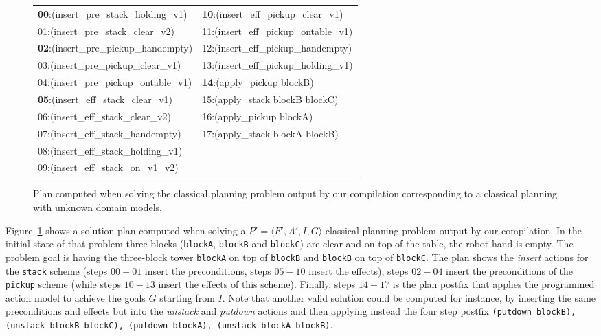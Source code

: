 \documentclass{article}
\newcommand{\tup}[1]{{\langle #1 \rangle}}
\begin{document}
\begin{figure}[hbt!]
	{\tiny\tt

\begin{tabular}{ll}
		{\bf 00}:(insert\_pre\_stack\_holding\_v1) & {\bf 10}:(insert\_eff\_pickup\_clear\_v1) \\
		01:(insert\_pre\_stack\_clear\_v2) & 11:(insert\_eff\_pickup\_ontable\_v1)\\
                {\bf 02}:(insert\_pre\_pickup\_handempty) & 12:(insert\_eff\_pickup\_handempty)\\
                03:(insert\_pre\_pickup\_clear\_v1) & 13:(insert\_eff\_pickup\_holding\_v1)\\
                04:(insert\_pre\_pickup\_ontable\_v1) & {\bf 14}:(apply\_pickup blockB)\\
                {\bf 05}:(insert\_eff\_stack\_clear\_v1) & 15:(apply\_stack blockB blockC)\\
                06:(insert\_eff\_stack\_clear\_v2) & 16:(apply\_pickup blockA)\\
                07:(insert\_eff\_stack\_handempty) & 17:(apply\_stack blockA blockB) \\
                08:(insert\_eff\_stack\_holding\_v1) & \\
                09:(insert\_eff\_stack\_on\_v1\_v2) &             		 
\end{tabular}
}
	\caption{\small Plan computed when solving the classical planning problem output by our compilation corresponding to a classical planning with unknown domain models.}
	\label{fig:plan-lplan}
\end{figure}

Figure~\ref{fig:plan-lplan} shows a solution plan computed when solving a $P'=\tup{F',A',I,G}$ classical planning problem output by our compilation. In the initial state of that problem three  blocks ({\small\tt blockA}, {\small\tt blockB} and {\small\tt blockC}) are clear and on top of the table, the robot hand is empty. The problem goal is having the three-block tower {\tt blockA} on top of {\tt blockB} and {\tt blockB} on top of {\tt blockC}. The plan shows the {\em insert} actions for the {\tt\small stack} scheme (steps $00-01$ insert the preconditions, steps $05-10$ insert the effects), steps $02-04$ insert the preconditions of the {\tt\small pickup} scheme (while steps $10-13$ insert the effects of this scheme). Finally, steps $14-17$ is the plan postfix that applies the programmed action model to achieve the goals $G$ starting from $I$. Note that another valid solution could be computed for instance, by inserting the same preconditions and effects but into the {\em unstack} and {\em putdown} actions and then applying instead the four step postfix {\tt\small (putdown blockB), (unstack blockB blockC), (putdown blockA), (unstack blockA blockB)}.
\end{document}
